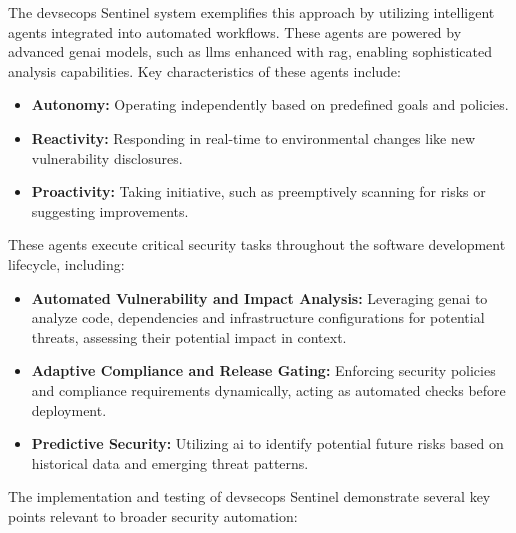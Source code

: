 The \gls{devsecops} Sentinel system exemplifies this approach by utilizing intelligent agents integrated into automated workflows. These agents are powered by advanced \gls{genai} models, such as \glspl{llm} enhanced with \gls{rag}, enabling sophisticated analysis capabilities\cite{pillala_devsecops_2024}. Key characteristics of these agents include:

\begin{itemize}
\item \textbf{Autonomy:} Operating independently based on predefined goals and policies.
\item \textbf{Reactivity:} Responding in real-time to environmental changes like new vulnerability disclosures.
\item \textbf{Proactivity:} Taking initiative, such as preemptively scanning for risks or suggesting improvements\cite{pillala_devsecops_2024}.
\end{itemize}
These agents execute critical security tasks throughout the software development lifecycle, including:
\begin{itemize}
\item \textbf{Automated Vulnerability and Impact Analysis:} Leveraging \gls{genai} to analyze code, dependencies and infrastructure configurations for potential threats, assessing their potential impact in context\cite{pillala_devsecops_2024}.
\item \textbf{Adaptive Compliance and Release Gating:} Enforcing security policies and compliance requirements dynamically, acting as automated checks before deployment\cite{pillala_devsecops_2024}.
\item \textbf{Predictive Security:} Utilizing \gls{ai} to identify potential future risks based on historical data and emerging threat patterns\cite{pillala_devsecops_2024}.
\end{itemize}
The implementation and testing of \gls{devsecops} Sentinel demonstrate several key points relevant to broader security automation:
